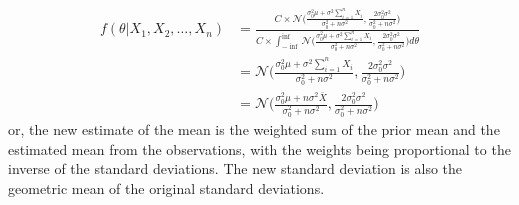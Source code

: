 \documentclass[../../probability-notes.tex]{subfiles}
\begin{document}
\begin{align*}
        f(\theta|X_{1}, X_{2}, \ldots, X_{n}) &= \frac{C \times \mathcal{N}\bigg(\frac{\sigma_{0}^{2} \mu + \sigma^{2}\sum_{i=1}^{n} X_{i}}{\sigma_{0}^{2} + n\sigma^{2}}, \frac{2\sigma_{0}^{2} \sigma^{2}}{\sigma_{0}^{2} + n\sigma^{2}}\bigg)}{C \times \int_{-\inf}^{\inf} \mathcal{N}\bigg(\frac{\sigma_{0}^{2} \mu + \sigma^{2}\sum_{i=1}^{n} X_{i}}{\sigma_{0}^{2} + n\sigma^{2}}, \frac{2\sigma_{0}^{2} \sigma^{2}}{\sigma_{0}^{2} + n\sigma^{2}}\bigg) d\theta}\\
        &= \mathcal{N}\bigg(\frac{\sigma_{0}^{2} \mu + \sigma^{2}\sum_{i=1}^{n} X_{i}}{\sigma_{0}^{2} + n\sigma^{2}}, \frac{2\sigma_{0}^{2} \sigma^{2}}{\sigma_{0}^{2} + n\sigma^{2}}\bigg)\\
        &= \mathcal{N}\bigg(\frac{\sigma_{0}^{2} \mu + n\sigma^{2}\overline{X}}{\sigma_{0}^{2} + n\sigma^{2}}, \frac{2\sigma_{0}^{2} \sigma^{2}}{\sigma_{0}^{2} + n\sigma^{2}}\bigg)
    \end{align*}
    or, the new estimate of the mean is the weighted sum of the prior mean and the estimated mean from the observations, with the weights being proportional to the inverse of the standard deviations. The new standard deviation is also the geometric mean of the original standard deviations.
\end{document}
